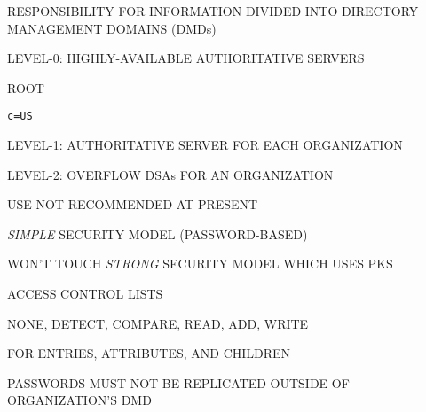 \begin{bwslide}

\begin{nrtc}
\item	RESPONSIBILITY FOR INFORMATION DIVIDED INTO DIRECTORY MANAGEMENT
	DOMAINS (DMDs)

\item	LEVEL-0: HIGHLY-AVAILABLE AUTHORITATIVE SERVERS
    \begin{nrtc}
    \item	ROOT

    \item	\verb"c=US"
    \end{nrtc}

\item	LEVEL-1: AUTHORITATIVE SERVER FOR EACH ORGANIZATION

\item	LEVEL-2: OVERFLOW DSAs FOR AN ORGANIZATION
    \begin{nrtc}
    \item	USE NOT RECOMMENDED AT PRESENT
    \end{nrtc}
\end{nrtc}
\end{bwslide}




\begin{bwslide}

\begin{nrtc}
\item	\emph{SIMPLE} SECURITY MODEL (PASSWORD-BASED)
    \begin{nrtc}
    \item	WON'T TOUCH \emph{STRONG} SECURITY MODEL WHICH USES PKS
    \end{nrtc}

\item	ACCESS CONTROL LISTS
    \begin{nrtc}
    \item	NONE, DETECT, COMPARE, READ, ADD, WRITE
    \end{nrtc}
    FOR ENTRIES, ATTRIBUTES, AND CHILDREN

\item	PASSWORDS MUST NOT BE REPLICATED OUTSIDE OF ORGANIZATION'S DMD
\end{nrtc}
\end{bwslide}




